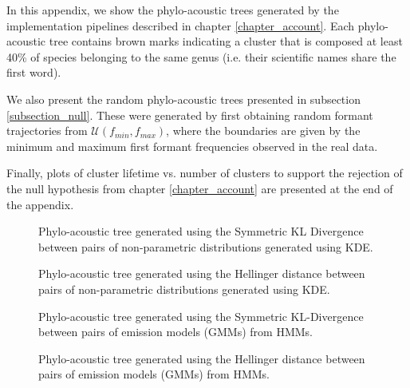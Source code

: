  \label{app_phylo}
In this appendix, we show the phylo-acoustic trees generated by the implementation pipelines described in chapter \ref{chapter_account}. Each phylo-acoustic tree contains brown marks indicating a cluster that is composed at least 40\% of species belonging to the same genus (i.e. their scientific names share the first word).
\par We also present the random phylo-acoustic trees presented in subsection \ref{subsection_null}. These were generated by first obtaining random formant trajectories from $\mathcal{U}(f_{min}, f_{max})$, where the boundaries are given by the minimum and maximum first formant frequencies observed in the real data.
\par Finally, plots of cluster lifetime vs. number of clusters to support the rejection of the null hypothesis from chapter \ref{chapter_account} are presented at the end of the appendix.
\begin{sidewaysfigure}[ht]
\noindent{}
    \caption{Phylo-acoustic tree generated using the Symmetric KL Divergence between pairs of non-parametric distributions generated using KDE.}
    \label{fig:kdeskld}
\end{sidewaysfigure}


\begin{sidewaysfigure}[ht]
\noindent{}
    \caption{Phylo-acoustic tree generated using the Hellinger distance between pairs of non-parametric distributions generated using KDE.}
    \label{fig:kdehellinger}
\end{sidewaysfigure}


\begin{sidewaysfigure}[ht]
\noindent{}
    \caption{Phylo-acoustic tree generated using the Symmetric KL-Divergence between pairs of emission models (GMMs) from HMMs.}
    \label{fig:gmmskld}
\end{sidewaysfigure}


\begin{sidewaysfigure}[ht]
\noindent{}
    \caption{Phylo-acoustic tree generated using the Hellinger distance between pairs of emission models (GMMs) from HMMs.}
    \label{fig:gmmhellinger}
\end{sidewaysfigure}


